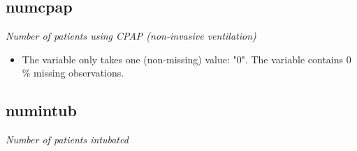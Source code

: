 \documentclass[]{article}
\providecommand{\tightlist}{%
  \setlength{\itemsep}{0pt}\setlength{\parskip}{0pt}}
\begin{document}
\noindent\makebox[\linewidth]{\rule{\textwidth}{0.4pt}}

\hypertarget{numcpap}{%
\subsection{numcpap}\label{numcpap}}

\emph{Number of patients using CPAP (non-invasive ventilation)}

\begin{itemize}
\tightlist
\item
  The variable only takes one (non-missing) value: "0". The variable
  contains 0 \% missing observations.
\end{itemize}

\noindent\makebox[\linewidth]{\rule{\textwidth}{0.4pt}}

\hypertarget{numintub}{%
\subsection{numintub}\label{numintub}}

\emph{Number of patients intubated}
\end{document}
